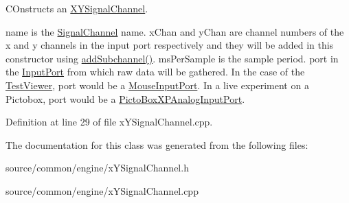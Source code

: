 C\-Onstructs an \hyperlink{class_picto_1_1_x_y_signal_channel}{X\-Y\-Signal\-Channel}. 

name is the \hyperlink{class_picto_1_1_signal_channel}{Signal\-Channel} name. x\-Chan and y\-Chan are channel numbers of the x and y channels in the input port respectively and they will be added in this constructor using \hyperlink{class_picto_1_1_signal_channel_abfe16a2da824414da1ed01ae72604077}{add\-Subchannel()}. ms\-Per\-Sample is the sample period. port in the \hyperlink{class_picto_1_1_input_port}{Input\-Port} from which raw data will be gathered. In the case of the \hyperlink{class_test_viewer}{Test\-Viewer}, port would be a \hyperlink{class_picto_1_1_mouse_input_port}{Mouse\-Input\-Port}. In a live experiment on a Pictobox, port would be a \hyperlink{class_picto_1_1_picto_box_x_p_analog_input_port}{Picto\-Box\-X\-P\-Analog\-Input\-Port}. 

Definition at line 29 of file x\-Y\-Signal\-Channel.\-cpp.



The documentation for this class was generated from the following files\-:\begin{DoxyCompactItemize}
\item 
source/common/engine/x\-Y\-Signal\-Channel.\-h\item 
source/common/engine/x\-Y\-Signal\-Channel.\-cpp\end{DoxyCompactItemize}
